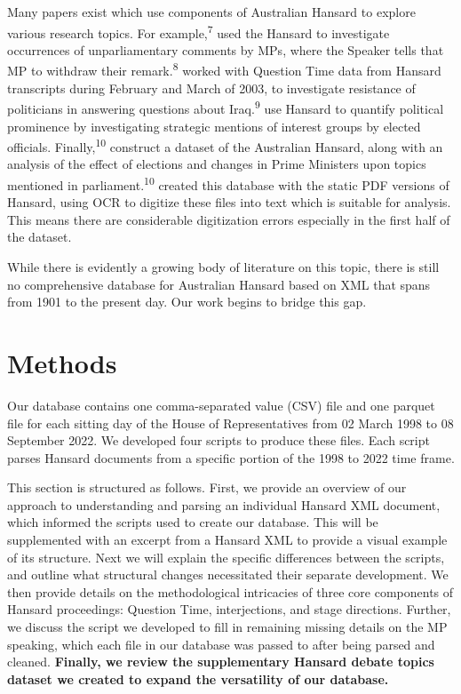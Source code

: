 \documentclass[
  letterpaper,
  DIV=11,
  numbers=noendperiod]{scrartcl}
\begin{document}
Many papers exist which use components of Australian Hansard to explore
various research topics. For example,\textsuperscript{7} used the
Hansard to investigate occurrences of unparliamentary comments by MPs,
where the Speaker tells that MP to withdraw their
remark.\textsuperscript{8} worked with Question Time data from Hansard
transcripts during February and March of 2003, to investigate resistance
of politicians in answering questions about Iraq.\textsuperscript{9} use
Hansard to quantify political prominence by investigating strategic
mentions of interest groups by elected officials.
Finally,\textsuperscript{10} construct a dataset of the Australian
Hansard, along with an analysis of the effect of elections and changes
in Prime Ministers upon topics mentioned in
parliament.\textsuperscript{10} created this database with the static
PDF versions of Hansard, using OCR to digitize these files into text
which is suitable for analysis. This means there are considerable
digitization errors especially in the first half of the dataset.

While there is evidently a growing body of literature on this topic,
there is still no comprehensive database for Australian Hansard based on
XML that spans from 1901 to the present day. Our work begins to bridge
this gap.

\hypertarget{methods}{%
\section{Methods}\label{methods}}

Our database contains one comma-separated value (CSV) file and one
parquet file for each sitting day of the House of Representatives from
02 March 1998 to 08 September 2022. We developed four scripts to produce
these files. Each script parses Hansard documents from a specific
portion of the 1998 to 2022 time frame.

This section is structured as follows. First, we provide an overview of
our approach to understanding and parsing an individual Hansard XML
document, which informed the scripts used to create our database. This
will be supplemented with an excerpt from a Hansard XML to provide a
visual example of its structure. Next we will explain the specific
differences between the scripts, and outline what structural changes
necessitated their separate development. We then provide details on the
methodological intricacies of three core components of Hansard
proceedings: Question Time, interjections, and stage directions.
Further, we discuss the script we developed to fill in remaining missing
details on the MP speaking, which each file in our database was passed
to after being parsed and cleaned. \textbf{Finally, we review the
supplementary Hansard debate topics dataset we created to expand the
versatility of our database.}
\end{document}
